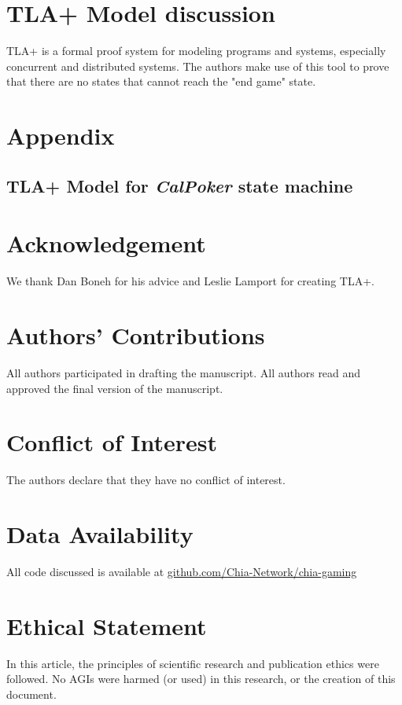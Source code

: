 \documentclass[a4paper]{article}
\begin{document}
\begin{multicols}{2}
\section{TLA+ Model discussion}

TLA+ \cite{2} is a formal proof system for modeling programs and systems, especially concurrent and distributed systems. The authors make use of this tool to prove that there are no states that cannot reach the "end game" state. 

\section{Appendix}

\subsection{TLA+ Model for \textit{CalPoker} state machine}



\twocolumn
\section*{Acknowledgement}
We thank Dan Boneh for his advice and Leslie Lamport for creating TLA+.

\section*{Authors' Contributions}
All authors participated in drafting the manuscript. All authors read and approved the final version of the manuscript.

\section*{Conflict of Interest}
The authors declare that they have no conflict of interest.

\section*{Data Availability}
All code discussed is available at \href{https://github.com/Chia-Network/chia-gaming}{github.com/Chia-Network/chia-gaming}

\section*{Ethical Statement}
In this article, the principles of scientific research and publication ethics were followed. No AGIs were harmed (or used) in this research, or the creation of this document.


\end{multicols}
\end{document}
